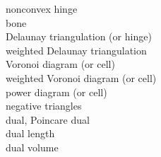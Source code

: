 \begin{description}
\item[nonconvex hinge] 

\item[bone] 

\item[Delaunay triangulation (or hinge)] 

\item[weighted Delaunay triangulation] 

\item[Voronoi diagram (or cell)] 

\item[weighted Voronoi diagram (or cell)] 

\item[power diagram (or cell)] 

\item[negative triangles] 

\item[dual, Poincare dual] 

\item[dual length] 

\item[dual volume] 
\end{description}
